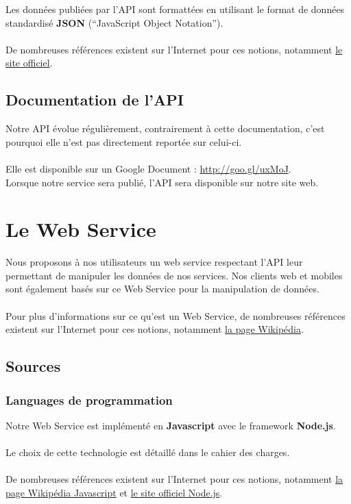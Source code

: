 \documentclass{life-fr}
\begin{document}
Les données publiées par l'API sont formattées en utilisant le format
de données standardisé \textbf{JSON} (``JavaScript Object Notation'').\\
\\
De nombreuses références existent sur l'Internet pour ces notions, notamment
\href{http://www.json.org/}{le site officiel}.

\subsection{Documentation de l'API}

Notre API évolue régulièrement, contrairement à cette documentation, c'est
pourquoi elle n'est pas directement reportée sur celui-ci.\\
\\
Elle est disponible sur un Google Document : \url{http://goo.gl/uxMoJ}.\\
Lorsque notre service sera publié, l'API sera disponible sur notre site
web.

\section{Le Web Service}

Nous proposons à nos utilisateurs un web service respectant l'API leur
permettant de manipuler les données de nos services. Nos clients web et
mobiles sont également basés sur ce Web Service pour la manipulation
de données.\\
\\
Pour plus d'informations sur ce qu'est un Web Service, de nombreuses
références existent sur l'Internet pour ces notions, notamment
\href{http://fr.wikipedia.org/wiki/Service_Web}{la page Wikipédia}.

\subsection{Sources}

\subsubsection{Languages de programmation}

Notre Web Service est implémenté en \textbf{Javascript}
avec le framework \textbf{Node.js}.\\
\\
Le choix de cette technologie est détaillé dans le cahier des charges.\\
\\
De nombreuses références existent sur l'Internet pour ces notions, notamment
\href{http://fr.wikipedia.org/wiki/JavaScript}{la page Wikipédia Javascript}
et \href{http://nodejs.org/}{le site officiel Node.js}.
\end{document}
